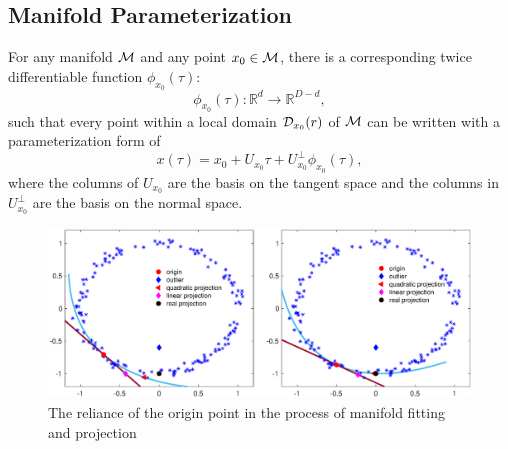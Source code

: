 \documentclass{article}
\theoremstyle{remark}
\begin{document}
\subsection{Manifold Parameterization}
For any manifold $\cal M$ and any point $x_0\in \cal M$, there is a corresponding twice differentiable function $\phi_{x_0}(\tau)$:
\[
\phi_{x_0}(\tau):{\mathbb R}^d\rightarrow {\mathbb R}^{D-d},
\]
such that every point within a local domain ${\cal D}_{x_0}(r)$ of $\cal M$ can be written with a parameterization form of 
\begin{equation}\label{manifold}
x(\tau)=  x_0 + U_{x_0} \tau+ U_{x_0}^{\perp} \phi_{x_0} (\tau),
\end{equation}
where the columns of $U_{x_0}$ are the basis on the tangent space and the columns in $U_{x_0}^{\perp}$ are the basis on the normal space. 
%
\begin{figure}[ht] %
   \centering
   \includegraphics[width=\linewidth]{democ3.eps} 
   \vspace{-0.5cm}
   \caption{The reliance of the origin point in the process of manifold fitting and projection}
   \label{Comparison}
\end{figure}
\end{document}
